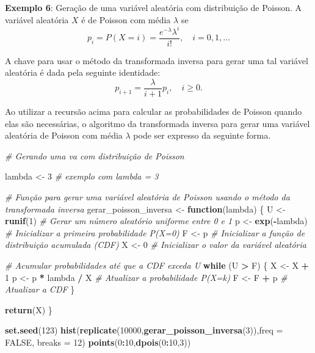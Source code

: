 \documentclass[
]{book}
\newenvironment{Shaded}{\begin{snugshade}}{\end{snugshade}}
\newcommand{\AttributeTok}[1]{\textcolor[rgb]{0.13,0.29,0.53}{#1}}
\newcommand{\CommentTok}[1]{\textcolor[rgb]{0.56,0.35,0.01}{\textit{#1}}}
\newcommand{\ConstantTok}[1]{\textcolor[rgb]{0.56,0.35,0.01}{#1}}
\newcommand{\ControlFlowTok}[1]{\textcolor[rgb]{0.13,0.29,0.53}{\textbf{#1}}}
\newcommand{\DecValTok}[1]{\textcolor[rgb]{0.00,0.00,0.81}{#1}}
\newcommand{\FunctionTok}[1]{\textcolor[rgb]{0.13,0.29,0.53}{\textbf{#1}}}
\newcommand{\NormalTok}[1]{#1}
\newcommand{\OtherTok}[1]{\textcolor[rgb]{0.56,0.35,0.01}{#1}}
\newcommand{\SpecialCharTok}[1]{\textcolor[rgb]{0.81,0.36,0.00}{\textbf{#1}}}
\begin{document}
\textbf{Exemplo 6}: Geração de uma variável aleatória com distribuição de
Poisson. A variável aleatória \(X\) é de Poisson com média \(\lambda\) se
\[p_{i} = P(X = i) = \frac{e^{-\lambda}\lambda^i}{i!}, \quad i=0,1,\ldots\]

A chave para usar o método da transformada inversa para gerar uma tal
variável aleatória é dada pela seguinte identidade:
\[p_{i+1}=\frac{\lambda}{i+1}p_{i}, \quad i\geq 0.\]

Ao utilizar a recursão acima para calcular as probabilidades de Poisson
quando elas são necessárias, o algoritmo da transformada inversa para
gerar uma variável aleatória de Poisson com média \(\lambda\) pode ser
expresso da seguinte forma.

\begin{Shaded}
\begin{Highlighting}[]
\CommentTok{\# Gerando uma va com distribuição de Poisson}

\NormalTok{lambda }\OtherTok{\textless{}{-}} \DecValTok{3}  \CommentTok{\# exemplo com lambda = 3}

\CommentTok{\# Função para gerar uma variável aleatória de Poisson usando o método da transformada inversa}
\NormalTok{gerar\_poisson\_inversa }\OtherTok{\textless{}{-}} \ControlFlowTok{function}\NormalTok{(lambda) \{}
\NormalTok{  U }\OtherTok{\textless{}{-}} \FunctionTok{runif}\NormalTok{(}\DecValTok{1}\NormalTok{)  }\CommentTok{\# Gerar um número aleatório uniforme entre 0 e 1}
\NormalTok{  p }\OtherTok{\textless{}{-}} \FunctionTok{exp}\NormalTok{(}\SpecialCharTok{{-}}\NormalTok{lambda)  }\CommentTok{\# Inicializar a primeira probabilidade P(X=0)}
\NormalTok{  F }\OtherTok{\textless{}{-}}\NormalTok{ p  }\CommentTok{\# Inicializar a função de distribuição acumulada (CDF)}
\NormalTok{  X }\OtherTok{\textless{}{-}} \DecValTok{0}  \CommentTok{\# Inicializar o valor da variável aleatória}
  
  \CommentTok{\# Acumular probabilidades até que a CDF exceda U}
  \ControlFlowTok{while}\NormalTok{ (U }\SpecialCharTok{\textgreater{}}\NormalTok{ F) \{}
\NormalTok{    X }\OtherTok{\textless{}{-}}\NormalTok{ X }\SpecialCharTok{+} \DecValTok{1}
\NormalTok{    p }\OtherTok{\textless{}{-}}\NormalTok{ p }\SpecialCharTok{*}\NormalTok{ lambda }\SpecialCharTok{/}\NormalTok{ X  }\CommentTok{\# Atualizar a probabilidade P(X=k)}
\NormalTok{    F }\OtherTok{\textless{}{-}}\NormalTok{ F }\SpecialCharTok{+}\NormalTok{ p  }\CommentTok{\# Atualizar a CDF}
\NormalTok{  \}}
  
  \FunctionTok{return}\NormalTok{(X)}
\NormalTok{\}}

\FunctionTok{set.seed}\NormalTok{(}\DecValTok{123}\NormalTok{)}
\FunctionTok{hist}\NormalTok{(}\FunctionTok{replicate}\NormalTok{(}\DecValTok{10000}\NormalTok{,}\FunctionTok{gerar\_poisson\_inversa}\NormalTok{(}\DecValTok{3}\NormalTok{)),}\AttributeTok{freq =} \ConstantTok{FALSE}\NormalTok{, }\AttributeTok{breaks =} \DecValTok{12}\NormalTok{)}
\FunctionTok{points}\NormalTok{(}\DecValTok{0}\SpecialCharTok{:}\DecValTok{10}\NormalTok{,}\FunctionTok{dpois}\NormalTok{(}\DecValTok{0}\SpecialCharTok{:}\DecValTok{10}\NormalTok{,}\DecValTok{3}\NormalTok{))}
\end{Highlighting}
\end{Shaded}
\end{document}
